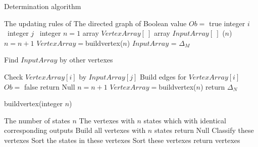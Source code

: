 \begin{algorithm}[h]
\caption{Determination algorithm}
\begin{algorithmic}[1]
\REQUIRE 
The updating rules of \BCN
\ENSURE  
The directed graph of \BCN
\STATE Boolean value $Ob=$ true 
\STATE integer $i$ \
\STATE integer $j$ \
\STATE integer $n=1$
\STATE array $VertexArray[\ ]$
\STATE array $InputArray[\ ]$
($n$)
\STATE $n= n+1$
\STATE $VertexArray=${\sf buildvertex}($n$)
\IF{($p==2$)}
\STATE $InputArray$ = $\Delta_M$ 
\ELSE

\STATE Find $InputArray$ by other vertexes

\ENDIF
{}
\STATE Check $VertexArray[i]$ by $InputArray[j]$ 
\STATE Build edges for $VertexArray[i]$ 
\ENDFOR
{}
\STATE  $Ob=$ false 
\STATE return Null
\ENDIF
\ENDFOR
\STATE $n= n+1$
\STATE $VertexArray=${\sf buildvertex}($n$)
\ENDWHILE
\STATE return $\Delta_N$\
\end{algorithmic}
 \label{alg:1}
\end{algorithm}
\begin{algorithm}[h!]
\caption{{\sf buildvertex}(integer $n$)}
\begin{algorithmic}[1]
\REQUIRE 
The number of states $n$
\ENSURE  
The vertexes with $n$ states which with identical corresponding outputs 
\STATE  Build all vertexes with $n$ states 
\STATE  return Null
\ELSE 
\STATE  Classify these vertexes
\STATE Sort the states in these vertexes
\STATE Sort these vertexes
\STATE return vertexes
\ENDIF 
\end{algorithmic}
 \label{alg:2}
\end{algorithm}

